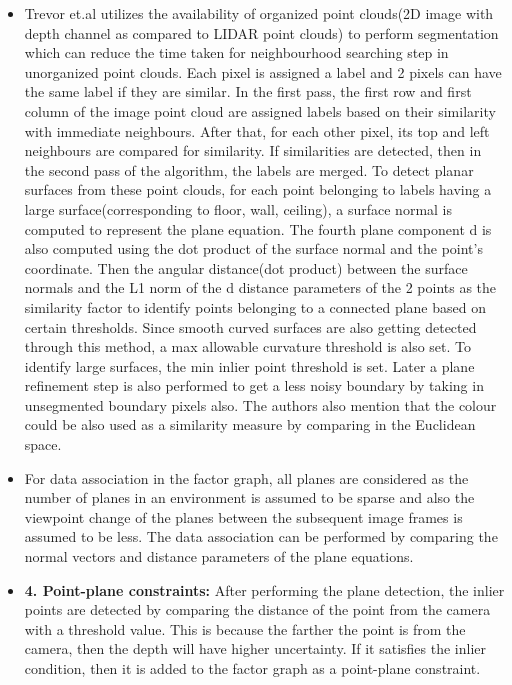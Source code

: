 \documentclass{article}
\begin{document}
\begin{itemize}
\item Trevor et.al \cite{effplaneseg} utilizes the availability of organized point clouds(2D image with depth channel as compared to LIDAR point clouds) to perform segmentation which can reduce the time taken for neighbourhood searching step in unorganized point clouds. Each pixel is assigned a label and 2 pixels can have the same label if they are similar. In the first pass, the first row and first column of the image point cloud are assigned labels based on their similarity with immediate neighbours. After that, for each other pixel, its top and left neighbours are compared for similarity. If similarities are detected, then in the second pass of the algorithm, the labels are merged. To detect planar surfaces from these point clouds, for each point belonging to labels having a large surface(corresponding to floor, wall, ceiling), a surface normal is computed to represent the plane equation. The fourth plane component d is also computed using the dot product of the surface normal and the point's coordinate. Then the angular distance(dot product) between the surface normals and the L1 norm of the d distance parameters of the 2 points as the similarity factor to identify points belonging to a connected plane based on certain thresholds. Since smooth curved surfaces are also getting detected through this method, a max allowable curvature threshold is also set. To identify large surfaces, the min inlier point threshold is set. Later a plane refinement step is also performed to get a less noisy boundary by taking in unsegmented boundary pixels also. The authors also mention that the colour could be also used as a similarity measure by comparing in the Euclidean space.
\item For data association in the factor graph, all planes are considered as the number of planes in an environment is assumed to be sparse and also the viewpoint change of the planes between the subsequent image frames is assumed to be less. The data association can be performed by comparing the normal vectors and distance parameters of the plane equations.

\item \textbf{4. Point-plane constraints: } After performing the plane detection, the inlier points are detected by comparing the distance of the point from the camera with a threshold value. This is because the farther the point is from the camera, then the depth will have higher uncertainty. If it satisfies the inlier condition, then it is added to the factor graph as a point-plane constraint.


\end{itemize}
\end{document}
